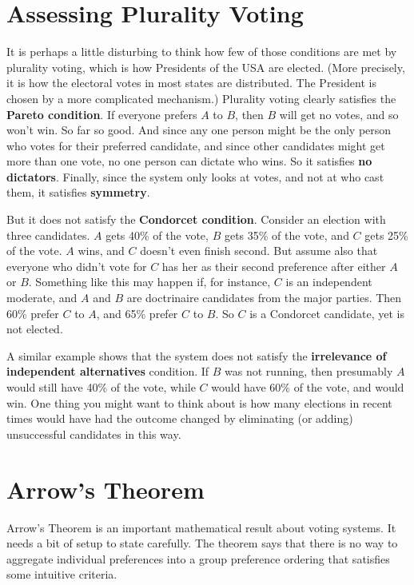 \begin{multicols}{2}
\section{Assessing Plurality Voting}
It is perhaps a little disturbing to think how few of those conditions are met by plurality voting, which is how Presidents of the USA are elected. (More precisely, it is how the electoral votes in most states are distributed. The President is chosen by a more complicated mechanism.) Plurality voting clearly satisfies the \textbf{Pareto condition}. If everyone prefers $A$ to $B$, then $B$ will get no votes, and so won't win. So far so good. And since any one person might be the only person who votes for their preferred candidate, and since other candidates might get more than one vote, no one person can dictate who wins. So it satisfies \textbf{no dictators}. Finally, since the system only looks at votes, and not at who cast them, it satisfies \textbf{symmetry}.

But it does not satisfy the \textbf{Condorcet condition}. Consider an election with three candidates. $A$ gets 40\% of the vote, $B$ gets 35\% of the vote, and $C$ gets 25\% of the vote. $A$ wins, and $C$ doesn't even finish second. But assume also that everyone who didn't vote for $C$ has her as their second preference after either $A$ or $B$. Something like this may happen if, for instance, $C$ is an independent moderate, and $A$ and $B$ are doctrinaire candidates from the major parties. Then 60\% prefer $C$ to $A$, and 65\% prefer $C$ to $B$. So $C$ is a Condorcet candidate, yet is not elected.

A similar example shows that the system does not satisfy the \textbf{irrelevance of independent alternatives} condition. If $B$ was not running, then presumably $A$ would still have 40\% of the vote, while $C$ would have 60\% of the vote, and would win. One thing you might want to think about is how many elections in recent times would have had the outcome changed by eliminating (or adding) unsuccessful candidates in this way. 

\section{Arrow's Theorem}

Arrow's Theorem is an important mathematical result about voting systems. It needs a bit of setup to state carefully. The theorem says that there is no way to aggregate individual preferences into a group preference ordering that satisfies some intuitive criteria.


\end{multicols}
